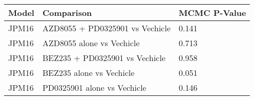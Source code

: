 \begin{table}[ht]
\centering
\begin{tabular}{lll}
  \hline
Model & Comparison & MCMC P-Value \\ 
  \hline
JPM16 & AZD8055 + PD0325901 vs Vechicle & 0.141 \\ 
  JPM16 & AZD8055 alone vs Vechicle & 0.713 \\ 
  JPM16 & BEZ235 + PD0325901 vs Vechicle & 0.958 \\ 
  JPM16 & BEZ235 alone vs Vechicle & 0.051 \\ 
  JPM16 & PD0325901 alone vs Vechicle & 0.146 \\ 
   \hline
\end{tabular}
\end{table}
